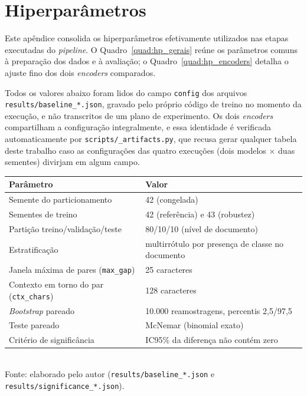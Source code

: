 \chapter[Hiperparâmetros]{Hiperparâmetros}
\label{ap:hiperparametros}

Este apêndice consolida os hiperparâmetros efetivamente utilizados nas etapas
executadas do \emph{pipeline}. O Quadro~\ref{quad:hp_gerais} reúne os parâmetros
comuns à preparação dos dados e à avaliação; o Quadro~\ref{quad:hp_encoders}
detalha o ajuste fino dos dois \emph{encoders} comparados.

Todos os valores abaixo foram lidos do campo \texttt{config} dos arquivos
\texttt{results/baseline\_*.json}, gravado pelo próprio código de treino no momento
da execução, e não transcritos de um plano de experimento. Os dois
\emph{encoders} compartilham a configuração integralmente, e essa identidade é
verificada automaticamente por \texttt{scripts/\_artifacts.py}, que recusa gerar
qualquer tabela deste trabalho caso as configurações das quatro execuções (dois
modelos $\times$ duas sementes) divirjam em algum campo.

\begin{quadro}[htbp]
  \centering
  \caption{Parâmetros gerais da preparação dos dados e da avaliação.}
  \label{quad:hp_gerais}
  \begin{tabular}{l p{7.2cm}}
  \toprule
  Parâmetro & Valor \\
  \midrule
  Semente do particionamento & 42 (congelada) \\
  Sementes de treino & 42 (referência) e 43 (robustez) \\
  Partição treino/validação/teste & 80/10/10 (nível de documento) \\
  Estratificação & multirrótulo por presença de classe no documento \\
  Janela máxima de pares (\texttt{max\_gap}) & 25 caracteres \\
  Contexto em torno do par (\texttt{ctx\_chars}) & 128 caracteres \\
  \emph{Bootstrap} pareado & 10.000 reamostragens, percentis 2,5/97,5 \\
  Teste pareado & McNemar (binomial exato) \\
  Critério de significância & IC95\% da diferença não contém zero \\
  \bottomrule
  \end{tabular}\\[4pt]
  {\footnotesize Fonte: elaborado pelo autor (\texttt{results/baseline\_*.json} e \texttt{results/significance\_*.json}).}
\end{quadro}

